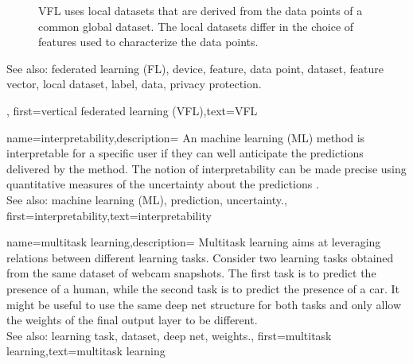 {{\begin{figure}[H]
\begin{center}
			\end{center}
			\caption{VFL uses local datasets that are derived from the data points of a common global dataset. 
				The local datasets differ in the choice of features used to characterize the data points.\label{fig_vertical_FL}}
		\end{figure}
		See also: federated learning (FL), device, feature, data point, dataset, feature vector, local dataset, label, data, privacy protection.},
	first={vertical federated learning (VFL)},text={VFL}
} 

{name={interpretability},description=
		{An machine learning (ML) method is interpretable for a specific user if 
			they can well anticipate the predictions delivered by the method. 
			The notion of interpretability can be made precise using quantitative 
			measures of the uncertainty about the predictions \cite{JunXML2020}.
						\\ 
		See also: machine learning (ML), prediction, uncertainty.},
		first={interpretability},text={interpretability}
}

{name={multitask learning},description=
	{Multitask learning aims at leveraging relations between 
	 different learning tasks. Consider two learning tasks obtained from the 
	 same dataset of webcam snapshots. The first task is to predict the presence 
	 of a human, while the second task is to predict the presence of a car. It might be useful 
	 to use the same deep net structure for both tasks and only allow the weights of 
	 the final output layer to be different.
	 			\\ 
		See also: learning task, dataset, deep net, weights.},
	first={multitask learning},text={multitask learning}
}

